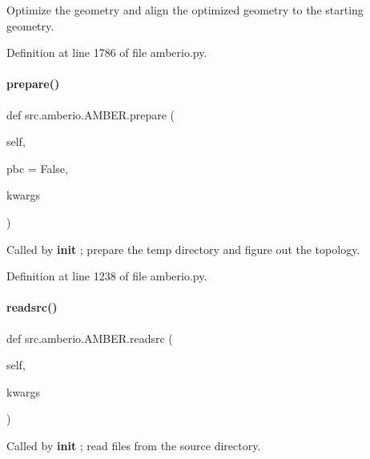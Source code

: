 Optimize the geometry and align the optimized geometry to the starting geometry. 



Definition at line 1786 of file amberio.\+py.

\mbox{\label{classsrc_1_1amberio_1_1AMBER_a305ddd7d694a342b08e337aa3ab35a5f}} 
\paragraph{\texorpdfstring{prepare()}{prepare()}}
{\footnotesize\ttfamily def src.\+amberio.\+A\+M\+B\+E\+R.\+prepare (\begin{DoxyParamCaption}\item[{}]{self,  }\item[{}]{pbc = {\ttfamily False},  }\item[{}]{kwargs }\end{DoxyParamCaption})}



Called by {\bfseries init} ; prepare the temp directory and figure out the topology. 



Definition at line 1238 of file amberio.\+py.

\mbox{\label{classsrc_1_1amberio_1_1AMBER_a8b829208dde4cb5d071db96f2ea420ac}} 
\paragraph{\texorpdfstring{readsrc()}{readsrc()}}
{\footnotesize\ttfamily def src.\+amberio.\+A\+M\+B\+E\+R.\+readsrc (\begin{DoxyParamCaption}\item[{}]{self,  }\item[{}]{kwargs }\end{DoxyParamCaption})}



Called by {\bfseries init} ; read files from the source directory. 



